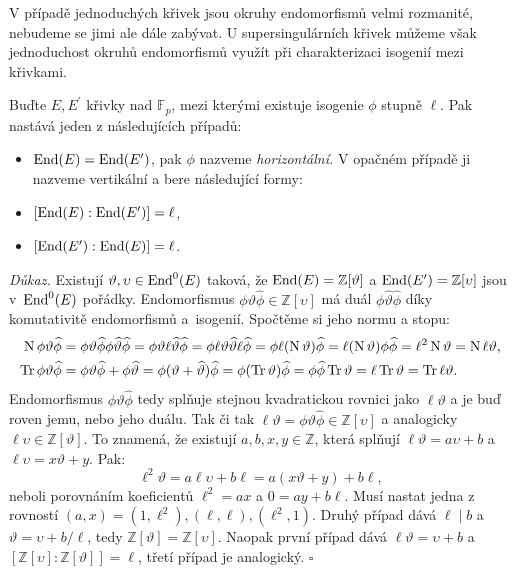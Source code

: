 \documentclass[12pt]{report}
\begin{document}
V případě jednoduchých křivek jsou okruhy endomorfismů velmi rozmanité, nebudeme se jimi ale dále zabývat. U supersingulárních křivek můžeme však jednoduchost okruhů endomorfismů využít při charakterizaci isogenií mezi křivkami.

\begin{veta}
Buďte $E,E^\prime$ křivky nad $\mathbb{F}_p$, mezi kterými existuje isogenie $\phi$ stupně $\ell$. Pak nastává jeden z následujících případů:
\begin{itemize}
\item $\operatorname{End}(E) = \operatorname{End}(E^\prime)$, pak $\phi$ nazveme \textit{horizontální.} V opačném případě ji nazveme vertikální a bere následující formy:
\item $[\operatorname{End}(E) : \operatorname{End}(E^\prime)] = \ell$,
\item $[\operatorname{End}(E^\prime) : \operatorname{End}(E)] = \ell$.
\end{itemize}
\end{veta}
\noindent \textit{Důkaz.} Existují $\vartheta,\upsilon \in \operatorname{End}^0 (E)$ taková, že $\operatorname{End}(E) = \mathbb{Z}[\vartheta]$ a $\operatorname{End}(E^\prime) = \mathbb{Z}[\upsilon]$ jsou v~$\operatorname{End} ^0 (E)$ pořádky. Endomorfismus $\phi \vartheta \widehat{\phi} \in \mathbb{Z}[\upsilon]$ má duál $\phi \widehat{\vartheta} \widehat{\phi}$ díky komutativitě endomorfismů a~isogenií. Spočtěme si jeho normu a stopu:
\begin{align*}
\operatorname{N} \phi \vartheta \widehat{\phi} &= \phi \vartheta \widehat{\phi} \phi \widehat{\vartheta} \widehat{\phi} = \phi \vartheta \ell \widehat{\vartheta} \widehat{\phi} = \phi \ell \vartheta \widehat{\vartheta} \ell \widehat{\phi} = \phi \ell (\operatorname{N} \vartheta) \widehat{\phi} = \ell (\operatorname{N} \vartheta) \phi \widehat{\phi} = \ell ^2 \operatorname{N} \vartheta = \operatorname{N} \ell \vartheta,\\
\operatorname{Tr} \phi \vartheta \widehat{\phi} &= \phi \vartheta \widehat{\phi} + \phi \widehat{\vartheta} = \phi (\vartheta + \widehat{\vartheta}) \widehat{\phi} = \phi (\operatorname{Tr}  \vartheta) \widehat{\phi} = \phi \widehat{\phi} \operatorname{Tr} \vartheta = \ell \operatorname{Tr} \vartheta = \operatorname{Tr} \ell \vartheta.
 \end{align*}
 Endomorfismus $\phi \vartheta \widehat{\phi}$ tedy splňuje stejnou kvadratickou rovnici jako $\ell \vartheta$ a je buď roven jemu, nebo jeho duálu. Tak či tak $\ell \vartheta = \phi \vartheta \widehat{\phi} \in \mathbb{Z} [ \upsilon ]$ a analogicky $\ell \upsilon \in \mathbb{Z} [ \vartheta]$. To znamená, že existují $a,b,x,y \in \mathbb{Z}$, která splňují $\ell \vartheta = a \upsilon + b$ a $\ell \upsilon = x \vartheta + y$. Pak:
\begin{equation*}
\ell^2 \vartheta = a \ell \upsilon + b \ell = a (x \vartheta + y) + b \ell,
\end{equation*}
neboli porovnáním koeficientů $\ell^2 = ax$ a $0 = ay + b \ell$. Musí nastat jedna z rovností $(a,x) = (1,\ell^2), (\ell,\ell), (\ell^2,1)$. Druhý případ dává $ \ell \mid b$ a $\vartheta = \upsilon + b/\ell$, tedy $\mathbb{Z}[\vartheta] = \mathbb{Z}[\upsilon]$. Naopak první případ dává $\ell \vartheta = \upsilon + b$ a $[\mathbb{Z}[\upsilon] : \mathbb{Z}[\vartheta]] = \ell$, třetí případ je analogický. \hfill $\square$\\
\end{document}
